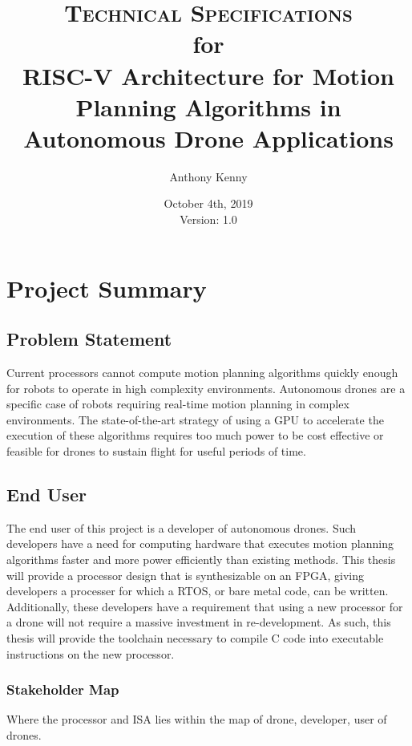 \documentclass[11pt, oneside]{article}      %
\title{\textsc{Technical Specifications} \\ 
	\small{for} \\ 
	\Large{RISC-V Architecture for Motion Planning Algorithms in Autonomous Drone Applications}}
\author{Anthony Kenny}
\date{October 4th, 2019 \\ 
	Version: 1.0}
\begin{document}
\maketitle


\section{Project Summary}


\subsection{Problem Statement}
Current processors cannot compute motion planning algorithms quickly enough for robots to operate in high complexity environments. Autonomous drones are a specific case of robots requiring real-time motion planning in complex environments. The state-of-the-art strategy of using a \ac{GPU} to accelerate the execution of these algorithms requires too much power to be cost effective or feasible for drones to sustain flight for useful periods of time.

\subsection{End User}
The end user of this project is a developer of autonomous drones. Such developers have a need for computing hardware that executes motion planning algorithms faster and more power efficiently than existing methods. This thesis will provide a processor design that is synthesizable on an \ac{FPGA}, giving developers a processer for which a \ac{RTOS}, or bare metal code, can be written. 
Additionally, these developers have a requirement that using a new processor for a drone will not require a massive investment in re-development. As such, this thesis will provide the toolchain necessary to compile C code into executable instructions on the new processor.

\subsubsection{Stakeholder Map}
Where the processor and \ac{ISA} lies within the map of drone, developer, user of drones.
\end{document}
